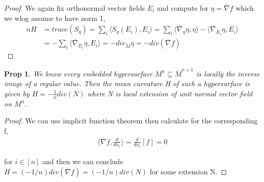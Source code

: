\documentclass[11pt]{article}
\newtheorem{prop}{Prop}
\begin{document}
\begin{proof}
	We again fix orthonormal vector fields $E_i$ and compute for $\eta = \overline{\nabla}f$ which we wlog assume to have norm 1, 
	\begin{align*}
		nH &= trace(S_{\eta}) = \sum_i \langle S_{\eta}(E_i),E_i\rangle = \sum_i \langle \overline{\nabla}_{\eta}\eta,\eta\rangle - \langle \overline{\nabla}_{E_i}\eta,E_i\rangle \\
		&= -\sum_i \langle \overline{\nabla}_{E_i} \eta,E_i\rangle = -div_{\overline{M}} \eta = -div(\overline{\nabla}f)
	\end{align*}


\end{proof}

\begin{prop}
	We know every embedded hypersurface $M^n \subseteq \overline{M}^{n+1}$ is locally the inverse image of a regular value. Then the mean curvature H of such a hypersurface is given by $H = -\frac{1}{n} div(N)$ where N is local extension of unit normal vector field on $M^n$.
\end{prop}

\begin{proof}
	We can use implicit function theorem then calculate for the corresponding f,
	\begin{align*}
		\langle \overline{\nabla} f,\frac{d}{dx_i}\rangle = \frac{d}{dx_i} [f] = 0
	\end{align*}

	for $i \in [n]$ and then we can conclude $H = (-1/n)div(\overline{\nabla}f) = (-1/n)div(N)$ for some extension N.
\end{proof}
	
\end{document}
